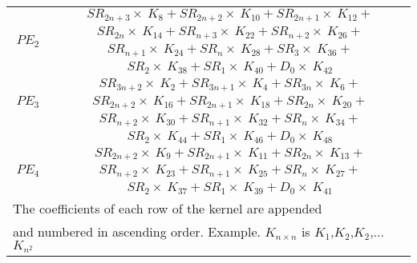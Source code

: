 \documentclass[journal]{IEEEtran}
\begin{document}
\begin{table}[h]
{\begin{tabular}{cc}
	\multirow{4}{*}{$PE_2$} & $SR_{2n+3} \times \ K_8 + SR_{2n+2} \times \ K_{10} + SR_{2n+1} \times \ K_{12} +$ \\ & $ SR_{2n} \times \ K_{14} + SR_{n+3} \times \ K_{22} + SR_{n+2} \times \ K_{26} + $\\ & $SR_{n+1} \times \ K_{24} + SR_{n} \times \ K_{28} + SR_{3} \times \ K_{36} +$ \\ & $SR_{2} \times \ K_{38} + SR_{1} \times \ K_{40} + D_{0} \times \ K_{42}$ \\
	\multirow{3}{*}{$PE_3$} & $SR_{3n+2} \times \ K_2 + SR_{3n+1} \times \ K_{4} + SR_{3n} \times \ K_{6} +$ \\ & $ SR_{2n+2} \times \ K_{16} + SR_{2n+1} \times \ K_{18} + SR_{2n} \times \ K_{20} +$ \\ & $ SR_{n+2} \times \ K_{30} + SR_{n+1} \times \ K_{32} + SR_{n} \times \ K_{34} + $\\& $ SR_{2} \times \ K_{44} + SR_{1} \times \ K_{46} + D_{0} \times \ K_{48}$ \\
	\multirow{3}{*}{$PE_4$} & $SR_{2n+2} \times \ K_9 + SR_{2n+1} \times \ K_{11} + SR_{2n} \times \ K_{13} +$ \\ & $ SR_{n+2} \times \ K_{23} + SR_{n+1} \times \ K_{25} + SR_{n} \times \ K_{27}  + $\\ & $ SR_{2} \times \ K_{37} + SR_{1} \times \ K_{39} + D_{0} \times \ K_{41}$ \\
    \hline
    \multicolumn{2}{l}{The coefficients of each row of the kernel are appended}\\
    \multicolumn{2}{l}{ and numbered in ascending order. Example. $K_{n\times n}$ is $K_1$,$K_2$,$K_2$,...$K_{n^2}$}\\
    \hline
	\end{tabular}}
\end{table}

 


\end{document}
